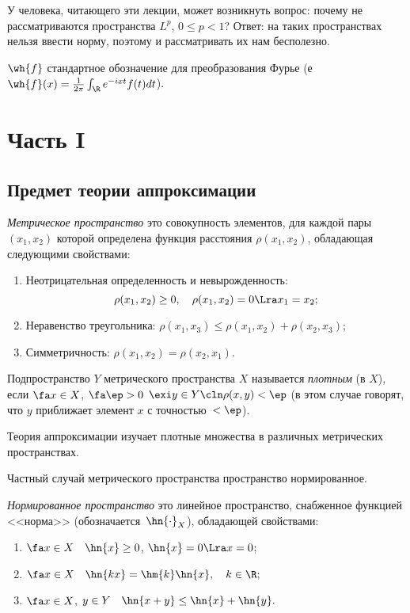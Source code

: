 \documentclass{article}
\begin{document}
\medskip

У человека, читающего эти лекции, может возникнуть вопрос: почему
не рассматриваются пространства $L^p$, $0\le p<1$? Ответ: на таких
пространствах нельзя ввести норму, поэтому и рассматривать их нам
бесполезно.

\medskip

$\wh{f}$ стандартное обозначение для преобразования Фурье (е
$\wh{f}(x)=\frac1{2\pi}\int_\R e^{-ixt}f(t)dt$).

\newpage

\tableofcontents
\newpage

\section{Часть I}

\subsection{Предмет теории аппроксимации}

\begin{df}
  \emph{Метрическое пространство} это совокупность элементов, для каждой пары $(x_1,x_2)$ которой
  определена функция расстояния $\rho(x_1,x_2)$, обладающая следующими свойствами:
  \begin{enumerate}
  \item Неотрицательная определенность и невырожденность:
    $$\rho(x_1,x_2) \ge 0,\quad \rho(x_1,x_2)=0\Lra x_1=x_2;$$
  \item Неравенство треугольника: $\rho(x_1,x_3)\le\rho(x_1,x_2)+\rho(x_2,x_3)$;
  \item Симметричность: $\rho(x_1,x_2)=\rho(x_2,x_1)$.
  \end{enumerate}
\end{df}

\begin{df}
  Подпространство $Y$ метрического пространства $X$
  называется \emph{плотным} (в $X$), если $\fa x\in X$, $\fa\ep>0$ $\exi y\in Y\cln \rho(x,y)<\ep$
  (в этом случае говорят, что $y$ приближает элемент $x$ с точностью~$<\ep$).
\end{df}

Теория аппроксимации изучает плотные множества в различных метрических пространствах.

Частный случай метрического пространства пространство нормированное.

\begin{df}
  \emph{Нормированное пространство} это линейное пространство, снабженное функцией
  <<норма>> (обозначается~$\hn{\cdot}_X$), обладающей свойствами:
  \begin{enumerate}
  \item
    $\fa x\in X\quad\hn{x}\ge 0$, $\hn{x}=0\Lra x=0$;
  \item
    $\fa x\in X\quad\hn{kx}=\hm{k}\hn{x},\quad k\in\R;$
  \item
    $\fa x\in X$, $y\in Y\quad\hn{x+y}\le\hn{x}+\hn{y}.$
  \end{enumerate}
\end{df}
\end{document}

